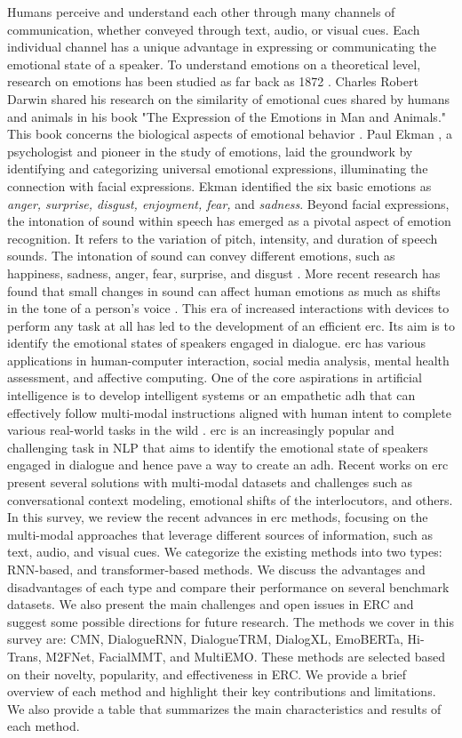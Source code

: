     Humans perceive and understand each other through many channels of communication, whether conveyed through text, audio, or visual cues. Each individual channel has a unique advantage in expressing or communicating the emotional state of a speaker. To understand emotions on a theoretical level, research on emotions has been studied as far back as 1872 \cite{ercontextsota}. Charles Robert Darwin shared his research on the similarity of emotional cues shared by humans and animals in his book "The Expression of the Emotions in Man and Animals." This book concerns the biological aspects of emotional behavior \cite{wikidarwin}. Paul Ekman \cite{ekman}, a psychologist and pioneer in the study of emotions, laid the groundwork by identifying and categorizing universal emotional expressions, illuminating the connection with facial expressions. Ekman identified the six basic emotions as \textit{anger, surprise, disgust, enjoyment, fear,} and \textit{sadness}. Beyond facial expressions, the intonation of sound within speech has emerged as a pivotal aspect of emotion recognition. It refers to the variation of pitch, intensity, and duration of speech sounds. The intonation of sound can convey different emotions, such as happiness, sadness, anger, fear, surprise, and disgust \cite{emocaps}. More recent research has found that small changes in sound can affect human emotions as much as shifts in the tone of a person’s voice \cite{erkin}. This era of increased interactions with devices to perform any task at all has led to the development of an efficient \ac{erc}. Its aim is to identify the emotional states of speakers engaged in dialogue. \ac{erc} has various applications in human-computer interaction, social media analysis, mental health assessment, and affective computing. One of the core aspirations in artificial intelligence is to develop intelligent systems or an empathetic \ac{adh} that can effectively follow multi-modal instructions aligned with human intent to complete various real-world tasks in the wild \cite{visual, assistant}. \ac{erc} is an increasingly popular and challenging task in NLP that aims to identify the emotional state of speakers engaged in dialogue and hence pave a way to create an \ac{adh}. Recent works on \ac{erc} present several solutions with multi-modal datasets and challenges such as conversational context modeling, emotional shifts of the interlocutors, and others. In this survey, we review the recent advances in \ac{erc} methods, focusing on the multi-modal approaches that leverage different sources of information, such as text, audio, and visual cues. We categorize the existing methods into two types: RNN-based, and transformer-based methods. We discuss the advantages and disadvantages of each type and compare their performance on several benchmark datasets. We also present the main challenges and open issues in ERC and suggest some possible directions for future research. The methods we cover in this survey are: CMN, DialogueRNN, DialogueTRM, DialogXL, EmoBERTa, Hi-Trans, M2FNet, FacialMMT, and MultiEMO. These methods are selected based on their novelty, popularity, and effectiveness in ERC. We provide a brief overview of each method and highlight their key contributions and limitations. We also provide a table that summarizes the main characteristics and results of each method.